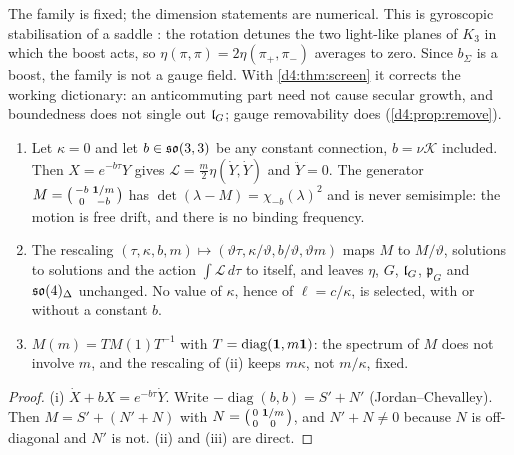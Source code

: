The family is fixed; the dimension statements are numerical. This is gyroscopic stabilisation of a saddle \cite{ThomsonTait1879,Kirillov2013}:
the rotation detunes the two light-like planes of $K_3$ in which the boost acts, so $\eta(\pi,\pi)=2\eta(\pi_+,\pi_-)$ averages to zero. Since
$b_\Sigma$ is a boost, the family is not a gauge field. With \cref{d4:thm:screen} it corrects the working dictionary: an anticommuting part need
not cause secular growth, and boundedness does not single out $\mathfrak l_G$; gauge removability does (\cref{d4:prop:remove}).

\begin{proposition}
\label{d4:prop:alone}
\begin{enumerate}[label=(\roman*),leftmargin=2.2em]
\item Let $\kappa=0$ and let $b\in\mathfrak{so}(3,3)$ be any constant connection, $b=\nu\mathcal K$ included. Then $X=e^{-b\tau}Y$ gives
$\mathcal L=\tfrac m2\eta(\dot Y,\dot Y)$ and $\ddot Y=0$. The generator $M=\bigl(\begin{smallmatrix}-b&\mathbf 1/m\\0&-b\end{smallmatrix}\bigr)$ has
$\det(\lambda-M)=\chi_{-b}(\lambda)^2$ and is never semisimple: the motion is free drift, and there is no binding frequency.
\item The rescaling $(\tau,\kappa,b,m)\mapsto(\vartheta\tau,\kappa/\vartheta,b/\vartheta,\vartheta m)$ maps $M$ to $M/\vartheta$, solutions to solutions and the action
$\int\mathcal L\,d\tau$ to itself, and leaves $\eta$, $G$, $\mathfrak l_G$, $\mathfrak p_G$ and $\mathfrak{so}(4)_\Delta$ unchanged. No value of $\kappa$, hence of $\ell=c/\kappa$, is
selected, with or without a constant $b$.
\item $M(m)=TM(1)T^{-1}$ with $T=\operatorname{diag}(\mathbf 1,m\mathbf 1)$: the spectrum of $M$ does not involve $m$, and the rescaling of (ii) keeps $m\kappa$,
not $m/\kappa$, fixed.
\end{enumerate}
\end{proposition}

\begin{proof}
(i) $\dot X+bX=e^{-b\tau}\dot Y$. Write $-\operatorname{diag}(b,b)=S'+N'$ (Jordan--Chevalley). Then $M=S'+(N'+N)$ with
$N=\bigl(\begin{smallmatrix}0&\mathbf 1/m\\0&0\end{smallmatrix}\bigr)$, and $N'+N\neq0$ because $N$ is off-diagonal and $N'$ is not. (ii) and (iii) are direct.
\end{proof}

